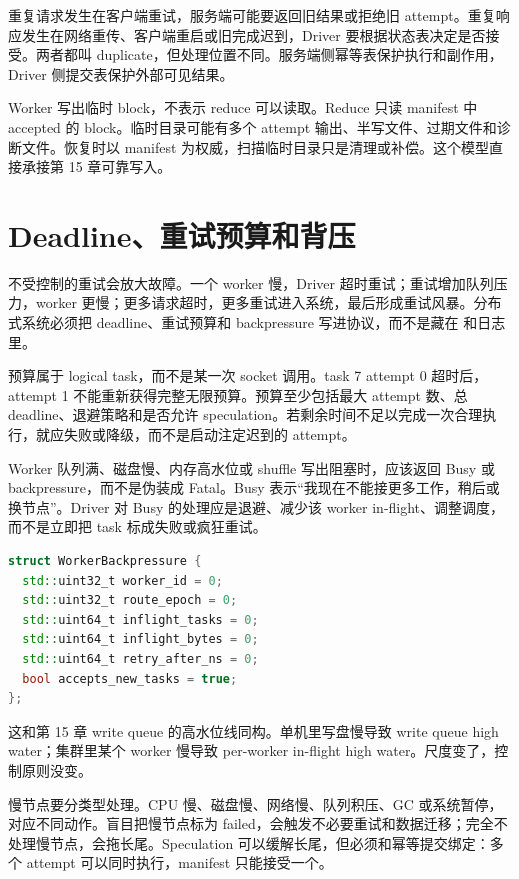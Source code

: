 重复请求发生在客户端重试，服务端可能要返回旧结果或拒绝旧 attempt。重复响应发生在网络重传、客户端重启或旧完成迟到，Driver 要根据状态表决定是否接受。两者都叫 duplicate，但处理位置不同。服务端侧幂等表保护执行和副作用，Driver 侧提交表保护外部可见结果。

Worker 写出临时 block，不表示 reduce 可以读取。Reduce 只读 manifest 中 accepted 的 block。临时目录可能有多个 attempt 输出、半写文件、过期文件和诊断文件。恢复时以 manifest 为权威，扫描临时目录只是清理或补偿。这个模型直接承接第 15 章可靠写入。

\section{Deadline、重试预算和背压}

不受控制的重试会放大故障。一个 worker 慢，Driver 超时重试；重试增加队列压力，worker 更慢；更多请求超时，更多重试进入系统，最后形成重试风暴。分布式系统必须把 deadline、重试预算和 backpressure 写进协议，而不是藏在  和日志里。

预算属于 logical task，而不是某一次 socket 调用。task 7 attempt 0 超时后，attempt 1 不能重新获得完整无限预算。预算至少包括最大 attempt 数、总 deadline、退避策略和是否允许 speculation。若剩余时间不足以完成一次合理执行，就应失败或降级，而不是启动注定迟到的 attempt。

Worker 队列满、磁盘慢、内存高水位或 shuffle 写出阻塞时，应该返回 Busy 或 backpressure，而不是伪装成 Fatal。Busy 表示“我现在不能接更多工作，稍后或换节点”。Driver 对 Busy 的处理应是退避、减少该 worker in-flight、调整调度，而不是立即把 task 标成失败或疯狂重试。

\begin{lstlisting}[language=C++,caption={节点背压的协议摘要}]
struct WorkerBackpressure {
  std::uint32_t worker_id = 0;
  std::uint32_t route_epoch = 0;
  std::uint64_t inflight_tasks = 0;
  std::uint64_t inflight_bytes = 0;
  std::uint64_t retry_after_ns = 0;
  bool accepts_new_tasks = true;
};
\end{lstlisting}

这和第 15 章 write queue 的高水位线同构。单机里写盘慢导致 write queue high water；集群里某个 worker 慢导致 per-worker in-flight high water。尺度变了，控制原则没变。

慢节点要分类型处理。CPU 慢、磁盘慢、网络慢、队列积压、GC 或系统暂停，对应不同动作。盲目把慢节点标为 failed，会触发不必要重试和数据迁移；完全不处理慢节点，会拖长尾。Speculation 可以缓解长尾，但必须和幂等提交绑定：多个 attempt 可以同时执行，manifest 只能接受一个。

